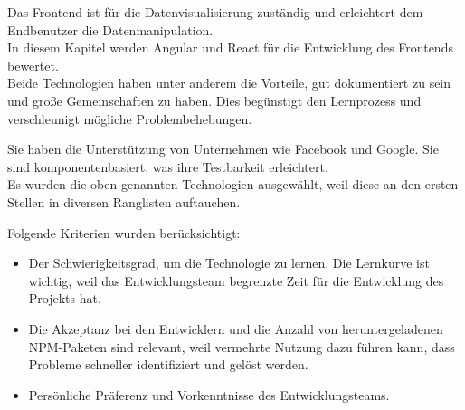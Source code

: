 \begin{flushleft}
  Das Frontend ist für die Datenvisualisierung zuständig und erleichtert dem Endbenutzer die Datenmanipulation.
  \\
  In diesem Kapitel werden Angular und React für die Entwicklung des Frontends bewertet.
  \\
  Beide Technologien haben unter anderem die Vorteile, gut dokumentiert zu sein und große Gemeinschaften zu haben. Dies begünstigt den Lernprozess und verschleunigt mögliche Problembehebungen.

  \begin{flushleft}
    Sie haben die Unterstützung von Unternehmen wie Facebook und Google. Sie sind komponentenbasiert, was ihre Testbarkeit erleichtert.
    \\
    Es wurden die oben genannten Technologien ausgewählt, weil diese an den ersten Stellen in diversen Ranglisten auftauchen{\cite{SO01}}.
  \end{flushleft}

  Folgende Kriterien wurden berücksichtigt:
  \begin{itemize}
    \item
          Der Schwierigkeitsgrad, um die Technologie zu lernen.
          Die Lernkurve ist wichtig, weil das Entwicklungsteam begrenzte Zeit für die Entwicklung des Projekts hat.


    \item
          Die Akzeptanz bei den Entwicklern und die Anzahl von heruntergeladenen NPM-Paketen sind relevant, weil vermehrte Nutzung dazu führen kann, dass Probleme schneller identifiziert und gelöst werden.{\cite{LIN1}}



    \item
          Persönliche Präferenz und Vorkenntnisse des Entwicklungsteams.
  \end{itemize}

\end{flushleft}

